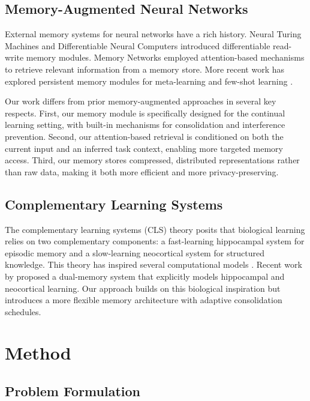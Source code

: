 \documentclass[11pt]{article}
\begin{document}
\subsection{Memory-Augmented Neural Networks}

External memory systems for neural networks have a rich history. Neural Turing Machines \citep{graves2014neural} and Differentiable Neural Computers \citep{graves2016hybrid} introduced differentiable read-write memory modules. Memory Networks \citep{weston2014memory, sukhbaatar2015end} employed attention-based mechanisms to retrieve relevant information from a memory store. More recent work has explored persistent memory modules for meta-learning \citep{santoro2016meta, munkhdalai2017meta} and few-shot learning \citep{kaiser2017learning}.

Our work differs from prior memory-augmented approaches in several key respects. First, our memory module is specifically designed for the continual learning setting, with built-in mechanisms for consolidation and interference prevention. Second, our attention-based retrieval is conditioned on both the current input and an inferred task context, enabling more targeted memory access. Third, our memory stores compressed, distributed representations rather than raw data, making it both more efficient and more privacy-preserving.

\subsection{Complementary Learning Systems}

The complementary learning systems (CLS) theory \citep{mcclelland1995there} posits that biological learning relies on two complementary components: a fast-learning hippocampal system for episodic memory and a slow-learning neocortical system for structured knowledge. This theory has inspired several computational models \citep{kumaran2016learning, zenke2017continual}. Recent work by \citet{arani2022learning} proposed a dual-memory system that explicitly models hippocampal and neocortical learning. Our approach builds on this biological inspiration but introduces a more flexible memory architecture with adaptive consolidation schedules.

\section{Method}
\label{sec:method}

\subsection{Problem Formulation}
\end{document}
